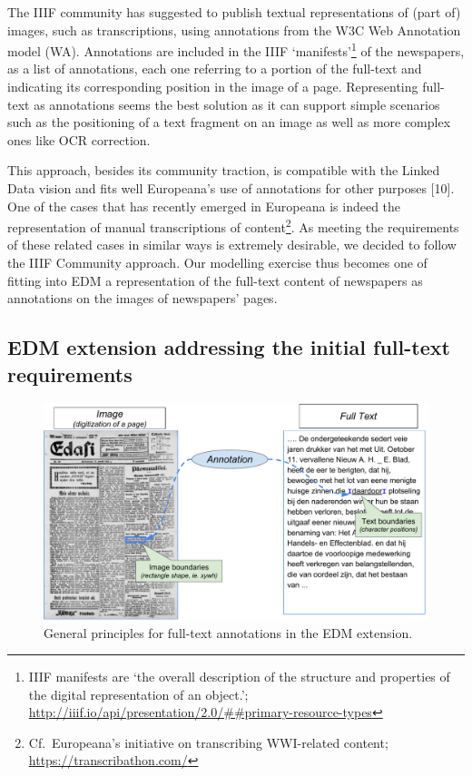 \documentclass[a4paper,UKenglish,cleveref, autoref]{oasics-v2019}
\begin{document}
The IIIF community has suggested to publish textual representations of (part of) images, such as transcriptions, using annotations from the W3C Web Annotation model (WA). Annotations are included in the IIIF
`manifests'\footnote{IIIF manifests are `the overall description of the structure and properties of the digital representation of an object.'; \url{http://iiif.io/api/presentation/2.0/##primary-resource-types}}
of the newspapers, as a list of annotations, each one referring to a portion of the full-text and indicating its corresponding position in the image of a page. Representing full-text as annotations seems the best solution as it can support simple scenarios such as the positioning of a text fragment on an image as well as more complex ones like OCR correction.

This approach, besides its community traction, is compatible with the Linked Data vision and fits well Europeana's use of annotations for other purposes [10]. One of the cases that has recently emerged in Europeana is indeed the representation of manual transcriptions of content\footnote{Cf.\, Europeana’s initiative on transcribing WWI-related content; \url{https://transcribathon.com/}}.
As meeting the requirements of these related cases in similar ways is extremely desirable, we decided to follow the IIIF Community approach. Our modelling exercise thus becomes one of fitting into EDM a representation of the full-text content of newspapers as annotations on the images of newspapers' pages. 

\subsection{EDM extension addressing the initial full-text requirements}
\label{sec:edmextension}

\begin{figure}
    \centering
    \includegraphics{Fig1}
    \caption{General principles for full-text annotations in the EDM extension.}
\end{figure}
\end{document}

